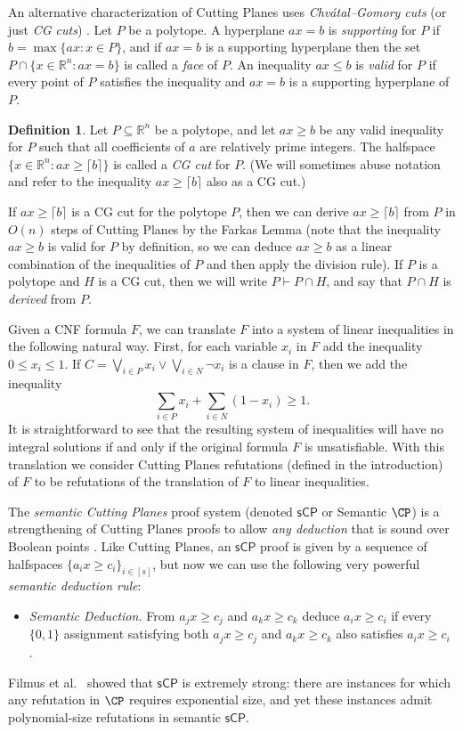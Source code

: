 \documentclass[11pt]{article}
\numberwithin{equation}{section}
\theoremstyle{definition}
\newtheorem{definition}[theorem]{Definition}
\theoremstyle{plain}
\newcommand{\reals}{\ensuremath{\mathbb{R}}}
\newcommand{\set}[1]{\{ #1 \}}
\newcommand{\sCP}{\ensuremath{\mathsf{sCP}}}
\begin{document}
An alternative characterization of Cutting Planes uses
\emph{Chv\'{a}tal--Gomory cuts} (or just \emph{CG cuts}) \cite{CookCT87, Chvatal73a}.
Let $P$ be a polytope.
A hyperplane $ax = b$ is \emph{supporting} for $P$ if $b = \max \set{ax : x \in P}$, and if $ax = b$ is a supporting hyperplane then the set $P \cap \set{x \in \reals^n : ax = b}$ is called a \emph{face} of $P$.
An inequality $ax \leq b$ is \emph{valid} for $P$ if every point of $P$ satisfies the inequality and $ax = b$ is a supporting hyperplane of $P$.
\begin{definition}\label{def:cg-cut}
	Let $P \subseteq \reals^n$ be a polytope, and let $ax \geq b$ be any valid inequality for $P$ such that all coefficients of $a$ are relatively prime integers.
	The halfspace $\set{x \in \reals^n : ax \geq \lceil b \rceil}$ is called a \emph{CG cut} for $P$. (We will sometimes abuse notation and refer to the inequality $ax \geq \lceil b \rceil$ also as a CG cut.)
\end{definition}
If $ax \geq \lceil b \rceil$ is a CG cut for the polytope $P$, then we can derive $ax \geq \lceil b \rceil$ from $P$ in $O(n)$ steps of Cutting Planes by
the  %
Farkas Lemma (note that the inequality $ax \geq b$ is valid for $P$ by definition, so we can deduce $ax \geq b$ as a linear combination of the inequalities of $P$ and then apply the division rule).
If $P$ is a polytope and $H$ is a CG cut, then we will write $P \vdash P \cap H$, and say that $P \cap H$ is \emph{derived} from $P$.


Given a CNF formula $F$, we can translate $F$ into a system of linear inequalities in the following natural way.
First, for each variable $x_i$ in $F$ add the inequality $0 \leq x_i \leq 1$.
If $C = \bigvee_{i \in P} x_i \vee \bigvee_{i \in N} \neg x_i$ is a clause in $F$, then we add the inequality \[\sum_{i \in P} x_i + \sum_{i \in N} (1-x_i) \geq 1. \]
It is straightforward to see that the resulting system of inequalities will have no integral solutions if and only if the original formula $F$ is unsatisfiable.
With this translation we consider Cutting Planes refutations (defined in the introduction) of $F$ to be refutations of the translation of $F$ to linear inequalities.



The \emph{semantic Cutting Planes} proof system (denoted $\sCP$ or Semantic $\CP$) is a strengthening of Cutting Planes proofs to allow \emph{any deduction} that is sound over Boolean points \cite{BonetPR97}.
Like Cutting Planes, an $\sCP$ proof is given by a sequence of halfspaces $\set{a_ix \geq c_i}_{i \in [s]}$, but now we can use the following very powerful \emph{semantic deduction rule}:
\begin{itemize}
	\item \emph{Semantic Deduction.} From $a_j x \geq c_j$ and $a_k x \geq c_k$ deduce $a_i x \geq c_i$ if every $\set{0,1}$ assignment satisfying both $a_jx \geq c_j$ and $a_k x \geq c_k$  also satisfies $a_ix \geq c_i$ .
\end{itemize}
Filmus et al.~\cite{FilmusHL16} showed that $\sCP$ is extremely strong: there are instances for which any refutation in $\CP$ requires exponential size, and yet these instances admit  polynomial-size refutations in semantic $\sCP$. 
\end{document}
